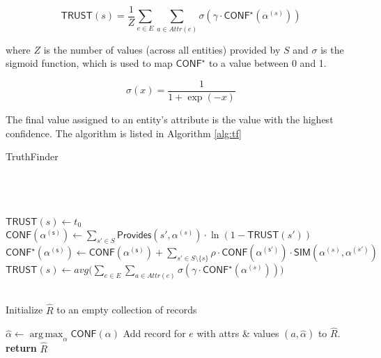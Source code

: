 \documentclass{acm_proc_article-sp}
\DeclareMathOperator*{\argmax}{arg\,max}
\begin{document}
\begin{equation}
\mathsf{TRUST}(s) = \frac{1}{Z} \sum_{e \in E}\sum_{a \in Attr(e)} \sigma(\gamma \cdot \mathsf{CONF}^\star(\alpha^{(s)}))
\end{equation}

where $Z$ is the number of values (across all entities) provided by $S$ and $\sigma$ is the sigmoid function, which is used to map $\mathsf{CONF}^\star$ to a value between 0 and 1.

\begin{equation}
\sigma(x) = \frac{1}{1 + \exp{(-x)}}
\end{equation}

The final value assigned to an entity's attribute is the value with the highest confidence. The algorithm is listed in Algorithm \ref{alg:tf} 

\begin{algorithm}
\caption{TruthFinder}
\begin{algorithmic}[1]
\small
{} \\
 \\
 \\

\State $\mathsf{TRUST}(s) \leftarrow t_0$
\EndFor
\\
\State $\mathsf{CONF(\alpha^{(s)})} \leftarrow \sum_{s' \in S} \mathsf{Provides}(s',\alpha^{(s)}) \cdot \ln(1-\mathsf{TRUST}(s'))$
\EndFor
{}
\State $\mathsf{CONF^\star(\alpha^{(s)})} \leftarrow \mathsf{CONF(\alpha^{(s)})} +   \sum_{s' \in S \setminus \{s\}} \rho \cdot \mathsf{CONF(\alpha^{(s')})}  \cdot \mathsf{SIM}(\alpha^{(s)},\alpha^{(s')})$
\EndFor
\EndFor
{}
\State $\mathsf{TRUST}(s) \leftarrow avg \big ( \sum_{e \in E}\sum_{a \in Attr(e)} \sigma(\gamma \cdot \mathsf{CONF}^\star(\alpha^{(s)})) \big )$
\EndFor
\EndWhile

\\
\State Initialize $\hat{R}$ to an empty collection of records

\State $\hat{\alpha} \leftarrow \argmax_{\alpha} \mathsf{CONF}(\alpha)$
\EndFor
\State Add record for $e$ with attrs \& values $(a, \hat{\alpha})$ to $\hat{R}$.
\EndFor
\\

\State \textbf{return} $\hat{R}$
\EndFunction
\end{algorithmic}
\label{alg:tf}
\end{algorithm}  
\end{document}
